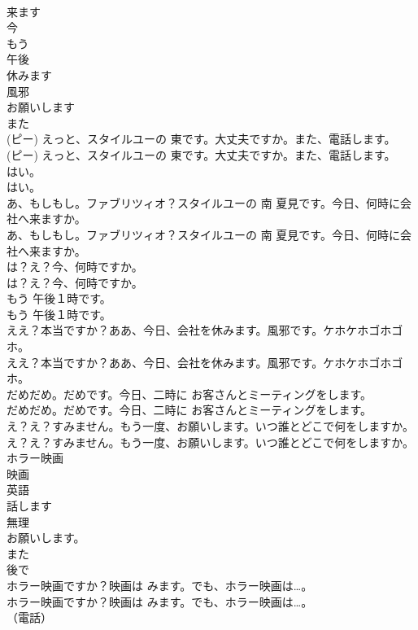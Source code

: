 \documentclass[8pt]{extreport}
\begin{document}
\begin{CJK}{UTF8}{min}
\\	来ます
\\	今
\\	もう
\\	午後
\\	休みます
\\	風邪
\\	お願いします
\\	また
\\	(ピー) えっと、スタイルユーの 東です。大丈夫ですか。また、電話します。	
\\	(ピー) えっと、スタイルユーの 東です。大丈夫ですか。また、電話します。 
\\	はい。	
\\	はい。 
\\	あ、もしもし。ファブリツィオ？スタイルユーの 南 夏見です。今日、何時に会社へ来ますか。	
\\	あ、もしもし。ファブリツィオ？スタイルユーの 南 夏見です。今日、何時に会社へ来ますか。 
\\	は？え？今、何時ですか。	
\\	は？え？今、何時ですか。 
\\	もう 午後１時です。	
\\	もう 午後１時です。 
\\	ええ？本当ですか？ああ、今日、会社を休みます。風邪です。ケホケホゴホゴホ。	
\\	ええ？本当ですか？ああ、今日、会社を休みます。風邪です。ケホケホゴホゴホ。 
\\	だめだめ。だめです。今日、二時に お客さんとミーティングをします。	
\\	だめだめ。だめです。今日、二時に お客さんとミーティングをします。 
\\	え？え？すみません。もう一度、お願いします。いつ誰とどこで何をしますか。	
\\	え？え？すみません。もう一度、お願いします。いつ誰とどこで何をしますか。 
\\	ホラー映画
\\	映画
\\	英語
\\	話します
\\	無理
\\	お願いします。
\\	また
\\	後で
\\	ホラー映画ですか？映画は みます。でも、ホラー映画は…。	
\\	ホラー映画ですか？映画は みます。でも、ホラー映画は…。 
\\	（電話）	

\end{CJK}
\end{document}
